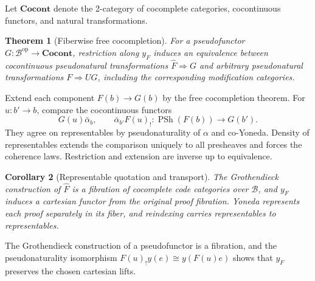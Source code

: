 \documentclass[12pt,a4paper,twoside]{extarticle}
\makeatletter
\theoremstyle{compactplain}
\newtheorem{theorem}{Theorem}[section]
\newtheorem{corollary}[theorem]{Corollary}
\theoremstyle{compactdef}
\renewenvironment{proof}[1][\proofname]{\par\pushQED{\qed}\normalfont
  \topsep2pt\trivlist\item[\hskip\labelsep\bfseries #1\@addpunct{.}]\ignorespaces}
 {\popQED\endtrivlist\@endpefalse}
\newcommand{\PSh}{\operatorname{PSh}}
\makeatother
\begin{document}
Let $\mathbf{Cocont}$ denote the 2-category of cocomplete categories, cocontinuous functors, and natural transformations.

\begin{theorem}[Fiberwise free cocompletion]\label{thm:fiberwise}
For a pseudofunctor $G:\mathcal B^{\mathrm{op}}\to\mathbf{Cocont}$, restriction along $y_F$ induces an equivalence between cocontinuous pseudonatural transformations $\widehat F\Rightarrow G$ and arbitrary pseudonatural transformations $F\Rightarrow UG$, including the corresponding modification categories.
\end{theorem}
\begin{proof}
Extend each component $F(b)\to G(b)$ by the free cocompletion theorem. For $u:b'\to b$, compare the cocontinuous functors
\[
G(u)\bar\alpha_b,\qquad \bar\alpha_{b'}F(u)_!: \PSh(F(b))\to G(b').
\]
They agree on representables by pseudonaturality of $\alpha$ and co-Yoneda. Density of representables extends the comparison uniquely to all presheaves and forces the coherence laws. Restriction and extension are inverse up to equivalence.
\end{proof}

\begin{corollary}[Representable quotation and transport]
The Grothendieck construction of $\widehat F$ is a fibration of cocomplete code categories over $\mathcal B$, and $y_F$ induces a cartesian functor from the original proof fibration. Yoneda represents each proof separately in its fiber, and reindexing carries representables to representables.
\end{corollary}
\begin{proof}
The Grothendieck construction of a pseudofunctor is a fibration, and the pseudonaturality isomorphism
$F(u)_!y(e)\cong y(F(u)e)$ shows that $y_F$ preserves the chosen cartesian lifts.
\end{proof}
\end{document}
